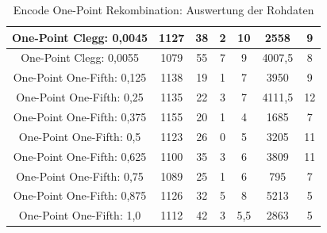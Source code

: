 \begin{table}[H]
\begin{tabular}{c | c | c | c | c | c | c}
		\hline
		One-Point Clegg: 0,0045 & 1127 & 38 & 2 & 10 & 2558 & 9\\
		\hline
		One-Point Clegg: 0,0055 & 1079 & 55 & 7 & 9 & 4007,5 & 8\\
		\hline
		One-Point One-Fifth: 0,125 & 1138 & 19 & 1 & 7 & 3950 & 9\\
		\hline
		One-Point One-Fifth: 0,25 & 1135 & 22 & 3 & 7 & 4111,5 & 12\\
		\hline
		One-Point One-Fifth: 0,375 & 1155 & 20 & 1 & 4 & 1685 & 7\\
		\hline
		One-Point One-Fifth: 0,5 & 1123 & 26 & 0 & 5 & 3205 & 11\\
		\hline
		One-Point One-Fifth: 0,625 & 1100 & 35 & 3 & 6 & 3809 & 11\\
		\hline
		One-Point One-Fifth: 0,75 & 1089 & 25 & 1 & 6 & 795 & 7\\
		\hline
		One-Point One-Fifth: 0,875 & 1126 & 32 & 5 & 8 & 5213 & 5\\
		\hline
		One-Point One-Fifth: 1,0 & 1112 & 42 & 3 & 5,5 & 2863 & 5\\
	\end{tabular}
	\caption{Encode One-Point Rekombination: Auswertung der Rohdaten}
	\label{table:encodeOnePointRohdaten}
\end{table}

